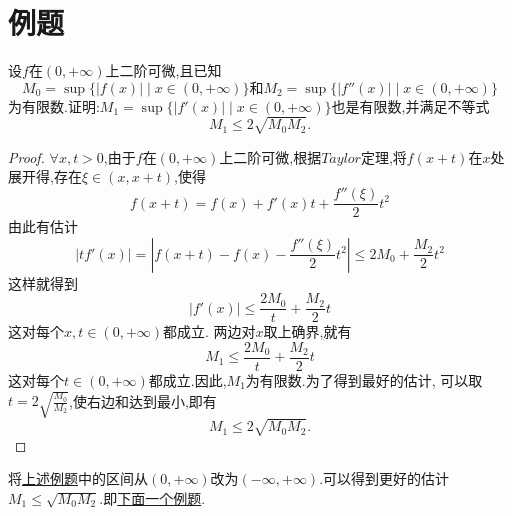 \documentclass[lang=cn,newtx,10pt,scheme=chinese]{elegantbook}
\begin{document}
\section{例题}

\begin{example}\label{example:1.1(由原函数和二阶导数上确界估计一阶导数上确界)}
    设\(f\)在\((0,+\infty)\)上二阶可微,且已知
    \begin{equation}
    M_0=\sup\{\vert f(x)\vert\mid x\in(0,+\infty)\}\text{和}M_2=\sup\{\vert f''(x)\vert\mid x\in(0,+\infty)\}
        \nonumber
    \end{equation}
    为有限数.证明:\(M_1=\sup\{\vert f'(x)\vert\mid x\in(0,+\infty)\}\)也是有限数,并满足不等式
    \begin{equation}
        M_1\leq2\sqrt{M_0M_2}.
        \nonumber
    \end{equation}
        \begin{proof}
        $\forall x,t>0$,由于$f$在$(0,+\infty)$上二阶可微,根据$Taylor$定理,将$f(x+t)$在$x$处展开得,存在$\xi\in(x,x+t)$,使得
        \begin{equation}
    f(x+t)=f(x)+f'(x)t+\frac{f''(\xi)}{2}t^2
    \nonumber
        \end{equation}
        由此有估计
        \begin{equation}
        |tf'(x)|=|f(x+t)-f(x)-\frac{f''(\xi)}{2}t^2|\leqslant2M_0+\frac{M_2}{2}t^2
            \nonumber
        \end{equation}
        这样就得到
        \begin{equation}
    |f'(x)|\leqslant\frac{2M_0}{t}+\frac{M_2}{2}t
            \nonumber
        \end{equation}
        这对每个$x,t\in(0,+\infty)$都成立.
        两边对$x$取上确界,就有
        \begin{equation}
            M_1\leqslant\frac{2M_0}{t}+\frac{M_2}{2}t
            \nonumber
        \end{equation}
        这对每个$t\in(0,+\infty)$都成立.因此,$M_1$为有限数.为了得到最好的估计,
        可以取$t=2\sqrt{\frac{M_0}{M_2}}$,使右边和达到最小,即有
        \begin{equation}
            M_1\leqslant2\sqrt{M_0M_2}.
            \nonumber
        \end{equation}
        \end{proof}
\end{example}
\begin{remark}
    将\hyperref[example:1.1(由原函数和二阶导数上确界估计一阶导数上确界)]{上述例题}中的区间从$(0,+\infty)$改为$(-\infty,+\infty)$.可以得到更好的估计$M_1\leqslant \sqrt{M_0M_2}$.即\hyperref[example:1.1(由原函数和二阶导数上确界估计一阶导数上确界)(区间为R)]{下面一个例题}.
\end{remark}
\end{document}
